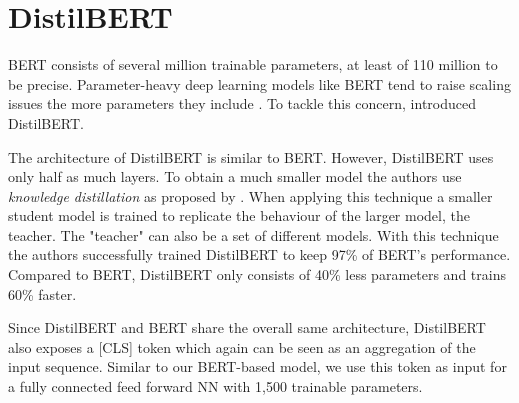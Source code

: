 \section{DistilBERT}
\label{chp:approach:sec:models:subsec:distilbert}

\Ac{BERT} consists of several million trainable parameters, at least of 110 million to be precise.
Parameter-heavy deep learning models like \ac{BERT} tend to raise scaling issues the more parameters they include \parencite{Schwartz:2019}.
To tackle this concern, \textcite{Sanh:2019} introduced \acl{DistilBERT}.

The architecture of \ac{DistilBERT} is similar to \ac{BERT}.
However, \ac{DistilBERT} uses only half as much layers.
To obtain a much smaller model the authors use \textit{knowledge distillation} as proposed by \textcites{Bucilua:2006}{Hinton:2015}.
When applying this technique a smaller student model is trained to replicate the behaviour of the larger model, the teacher.
The "teacher" can also be a set of different models.
With this technique the authors successfully trained \ac{DistilBERT} to keep 97\% of \ac{BERT}'s performance.
Compared to \ac{BERT}, \ac{DistilBERT} only consists of 40\% less parameters and trains 60\% faster. \parencite{Sanh:2019}

Since \ac{DistilBERT} and \ac{BERT} share the overall same architecture, \ac{DistilBERT} also exposes a [CLS] token which again can be seen as an aggregation of the input sequence.
Similar to our \ac{BERT}-based model, we use this token as input for a fully connected feed forward \ac{NN} with 1,500 trainable parameters.
